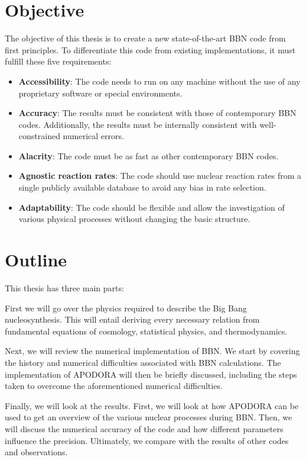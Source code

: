 \section{Objective} 
The objective of this thesis is to create a new state-of-the-art BBN code from first principles. To differentiate this code from existing implementations, it must fulfill these five requirements:

\begin{itemize}
    \item \textbf{Accessibility}: The code needs to run on any machine without the use of any proprietary software or special environments. %
    \item \textbf{Accuracy}: The results must be consistent with those of contemporary BBN codes. Additionally, the results must be internally consistent with well-constrained numerical errors. 
    \item \textbf{Alacrity}: The code must be as fast as other contemporary BBN codes.
    \item \textbf{Agnostic reaction rates}: The code should use nuclear reaction rates from a single publicly available database to avoid any bias in rate selection.
    \item \textbf{Adaptability}: The code should be flexible and allow the investigation of various physical processes without changing the basic structure.
\end{itemize}

\section{Outline}

This thesis has three main parts:

\noindent First we will go over the physics required to describe the Big Bang nucleosynthesis. This will entail deriving every necessary relation from fundamental equations of cosmology, statistical physics, and thermodynamics. 

\noindent Next, we will review the numerical implementation of BBN. We start by covering the history and numerical difficulties associated with BBN calculations. The implementation of APODORA will then be briefly discussed, including the steps taken to overcome the aforementioned numerical difficulties.


\noindent Finally, we will look at the results. First, we will look at how APODORA can be used to get an overview of the various nuclear processes during BBN. Then, we will discuss the numerical accuracy of the code and how different parameters influence the precision. Ultimately, we compare with the results of other codes and observations.





